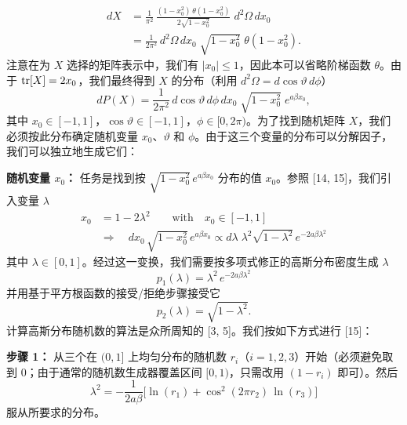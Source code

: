 \begin{equation}
  \begin{split}
    dX &= \frac{1}{\pi^2}\,\frac{(1-x_0^2)\,\theta(1-x_0^2)}{2\sqrt{1-x_0^2}}\;d^2\Omega\,dx_0 \\
    &= \frac{1}{2\pi^2}\,d^2\Omega\,dx_0\;\sqrt{1-x_0^2}\;\theta(1-x_0^2).
  \end{split}
\end{equation}
注意在为 $X$ 选择的矩阵表示中，我们有 $|x_0| \leq 1$，因此本可以省略阶梯函数 $\theta$。由于 $\operatorname{tr}[X] = 2x_0$，我们最终得到 $X$ 的分布（利用 $d^2\Omega = d\cos\vartheta\,d\phi$）
\begin{equation}
  dP(X) = \frac{1}{2\pi^2}\,d\cos\vartheta\,d\phi\,dx_0\;\sqrt{1-x_0^2}\;e^{a\beta x_0},
\end{equation}
其中 $x_0 \in [-1,1]$，$\cos\vartheta \in [-1,1]$，$\phi \in [0,2\pi)$。为了找到随机矩阵 $X$，我们必须按此分布确定随机变量 $x_0$、$\vartheta$ 和 $\phi$。由于这三个变量的分布可以分解因子，我们可以独立地生成它们：

\textbf{随机变量 $x_0$：} 任务是找到按 $\sqrt{1-x_0^2}\,e^{a\beta x_0}$ 分布的值 $x_0$。参照 [14, 15]，我们引入变量 $\lambda$
\begin{equation}
  \begin{split}
    x_0 &= 1 - 2\lambda^2 \qquad \text{with}\quad x_0 \in [-1,1] \\
    &\Rightarrow\quad dx_0\,\sqrt{1-x_0^2}\,e^{a\beta x_0}
    \propto d\lambda\;\lambda^2\sqrt{1-\lambda^2}\,e^{-2a\beta\lambda^2}
  \end{split}
\end{equation}
其中 $\lambda \in [0,1]$。经过这一变换，我们需要按多项式修正的高斯分布密度生成 $\lambda$
\begin{equation}
  p_1(\lambda) = \lambda^2\,e^{-2a\beta\lambda^2}
\end{equation}
并用基于平方根函数的接受/拒绝步骤接受它
\begin{equation}
  p_2(\lambda) = \sqrt{1-\lambda^2}.
\end{equation}
计算高斯分布随机数的算法是众所周知的 [3, 5]。我们按如下方式进行 [15]：

\textbf{步骤 1：} 从三个在 $(0,1]$ 上均匀分布的随机数 $r_i$（$i = 1, 2, 3$）开始（必须避免取到 0；由于通常的随机数生成器覆盖区间 $[0,1)$，只需改用 $(1-r_i)$ 即可）。然后
\begin{equation}
  \lambda^2 = -\frac{1}{2a\beta}\Big[\ln(r_1) + \cos^2(2\pi r_2)\,\ln(r_3)\Big]
\end{equation}
服从所要求的分布。

